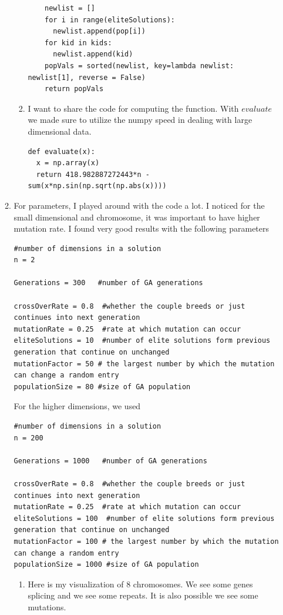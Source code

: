 \documentclass[11pt]{article}
\begin{document}
\begin{enumerate}
\begin{enumerate}
\begin{enumerate}
\begin{verbatim}
    newlist = []
    for i in range(eliteSolutions):
      newlist.append(pop[i])
    for kid in kids:
      newlist.append(kid)
    popVals = sorted(newlist, key=lambda newlist: newlist[1], reverse = False)
    return popVals

\end{verbatim}
\item I want to share the code for computing the function.  With $evaluate$ we made sure to utilize the numpy speed in dealing with large dimensional data.
\begin{verbatim}
def evaluate(x):
  x = np.array(x)
  return 418.982887272443*n -sum(x*np.sin(np.sqrt(np.abs(x))))
\end{verbatim}
\end{enumerate}
\item For parameters, I played around with the code a lot.  I noticed for the small dimensional and chromosome, it was important to have higher mutation rate.  I found very good results with the following parameters 
\begin{verbatim}
#number of dimensions in a solution
n = 2

Generations = 300   #number of GA generations

crossOverRate = 0.8  #whether the couple breeds or just continues into next generation
mutationRate = 0.25  #rate at which mutation can occur
eliteSolutions = 10  #number of elite solutions form previous generation that continue on unchanged
mutationFactor = 50 # the largest number by which the mutation can change a random entry
populationSize = 80 #size of GA population
\end{verbatim}

For the higher dimensions, we used 

\begin{verbatim}
#number of dimensions in a solution
n = 200

Generations = 1000   #number of GA generations

crossOverRate = 0.8  #whether the couple breeds or just continues into next generation
mutationRate = 0.25  #rate at which mutation can occur
eliteSolutions = 100  #number of elite solutions form previous generation that continue on unchanged
mutationFactor = 100 # the largest number by which the mutation can change a random entry
populationSize = 1000 #size of GA population
\end{verbatim}

\begin{enumerate}
\item Here is my visualization of 8 chromosomes.  We see some genes splicing and we see some repeats.  It is also possible we see some mutations.


\end{enumerate}
\end{enumerate}
\end{enumerate}
\end{document}
